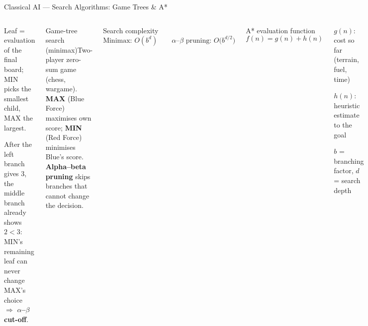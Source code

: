\documentclass[aspectratio=169,10pt,t]{beamer}
\begin{document}
\begin{frame}{Classical AI --- Search Algorithms: Game Trees \& A*}
\begin{columns}[T]
\begin{tl}\item Leaf = evaluation of the final board; MIN picks the smallest child, MAX the largest.\item After the left branch gives 3, the middle branch already shows $2<3$: MIN's remaining leaf can never change MAX's choice $\Rightarrow$ \textbf{$\alpha$--$\beta$ cut-off}.\end{tl}
\begin{cbox}[ISSAnavy]{Game-tree search (minimax)}\scriptsize Two-player zero-sum game (chess, wargame). \textbf{MAX} (Blue Force) maximises own score; \textbf{MIN} (Red Force) minimises Blue's score. \textbf{Alpha--beta pruning} skips branches that cannot change the decision.\end{cbox}
\begin{fbx}{Search complexity}\[\text{Minimax: }O(b^{d})\qquad \alpha\text{--}\beta\text{ pruning: }O\!\big(b^{d/2}\big)\]\end{fbx}
\begin{fbx}{A* evaluation function}\[f(n)=g(n)+h(n)\]\end{fbx}
\begin{tl}\item $g(n)$: cost so far (terrain, fuel, time)\item $h(n)$: heuristic estimate to the goal\item $b$ = branching factor, $d$ = search depth\end{tl}
\end{columns}
\end{frame}
\end{document}
